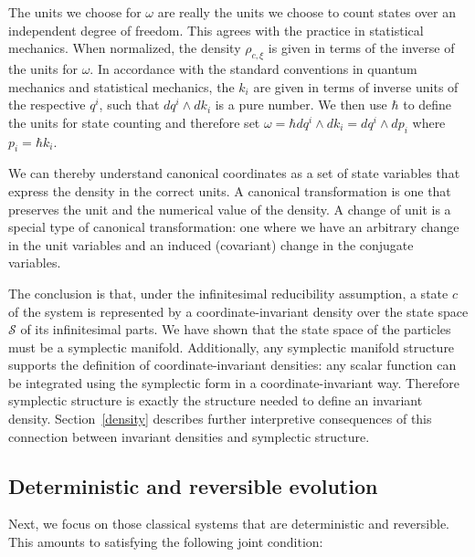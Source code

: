 \documentclass[12pt, english, twoside]{article} %
\begin{document}
The units we choose for $\omega$ are really the units we choose to count states over an independent degree of freedom. This agrees with the practice in statistical mechanics. When normalized, the density $\rho_{c, \xi}$ is given in terms of the inverse of the units for $\omega$. In accordance with the standard conventions in quantum mechanics and statistical mechanics, the $k_i$ are given in terms of inverse units of the respective $q^i$, such that $dq^i \wedge dk_i$ is a pure number. We then use $\hbar$ to define the units for state counting and therefore set $\omega = \hbar dq^i \wedge dk_i = dq^i \wedge dp_i$ where $p_i = \hbar k_i$.

We can thereby understand canonical coordinates as a set of state variables that express the density in the correct units. A canonical transformation is one that preserves the unit and the numerical value of the density. A change of unit is a special type of canonical transformation: one where we have an arbitrary change in the unit variables and an induced (covariant) change in the conjugate variables.

The conclusion is that, under the infinitesimal reducibility assumption, a state $c$ of the system is represented by a coordinate-invariant density over the state space $\mathcal{S}$ of its infinitesimal parts. We have shown that the state space of the particles must be a symplectic manifold. Additionally, any symplectic manifold structure supports the definition of coordinate-invariant densities: any scalar function can be integrated using the symplectic form in a coordinate-invariant way. Therefore symplectic structure is exactly the structure needed to define an invariant density. Section~\ref{density} describes further interpretive consequences of this connection between invariant densities and symplectic structure.

\subsection{Deterministic and reversible evolution}
\label{deterministic}

Next, we focus on those classical systems that are deterministic and reversible. This amounts to satisfying the following joint condition:
\end{document}
